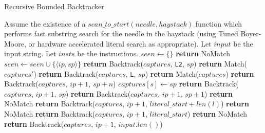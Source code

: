 \begin{algorithm}
\caption{Recursive Bounded Backtracker} \label{algo:recurboundedback}
\begin{algorithmic}
\State Assume the existence of a $scan\_to\_start(needle, haystack)$ function
        which performs fast substring search for the needle in the haystack
        (using Tuned Boyer-Moore, or hardware accelerated literal search
        as appropriate).
\State Let $input$ be the input string.
\State Let $insts$ be the instructions.
\State $seen \gets \{\}$
    \State \textbf{return} NoMatch
  \EndIf
  \State $seen \gets seen \cup \{\langle ip, sp \rangle\}$
          \State \textbf{return} Backtrack($captures$, {\tt L2}, $sp$)
        \EndCase
          \State \textbf{return} Match($captures'$)
        \EndCase
      \EndSwitch
    \EndCase
      \State \textbf{return} Backtrack($captures$, {\tt L}, $sp$)
    \EndCase
      \State \textbf{return} Match($captures$)
    \EndCase
      \State \textbf{return} Backtrack($captures$, $ip + 1$, $sp + n$)
    \EndCase
      \State $captures[s] \gets sp$
      \State \textbf{return} Backtrack($captures$, $ip + 1$, $sp$)
    \EndCase
        \State \textbf{return} Backtrack($captures$, $ip + 1$, $sp + 1$)
      \Else
        \State \textbf{return} NoMatch
      \EndIf
    \EndCase
        \State \textbf{return}
            Backtrack($captures$, $ip + 1$, $literal\_start + len(l)$)
      \Else
        \State \textbf{return} NoMatch
      \EndIf
    \EndCase
        \State \textbf{return}
                  Backtrack($captures$, $ip + 1$, $literal\_start$)
      \Else
        \State \textbf{return} NoMatch
      \EndIf
    \EndCase
      \State \textbf{return} Backtrack($captures$, $ip + 1$, $input.len()$)
    \EndCase
  \EndSwitch
\EndProcedure
\end{algorithmic}
\end{algorithm}

